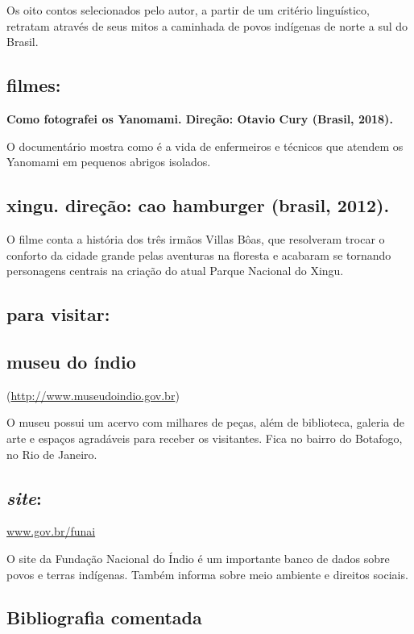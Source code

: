 \documentclass[12pt]{extarticle}
\begin{document}
Os oito contos selecionados pelo autor, a partir de um critério
linguístico, retratam através de seus mitos a caminhada de povos
indígenas de norte a sul do Brasil.

\subsection{filmes: }

\textbf{Como fotografei os Yanomami. Direção: Otavio Cury (Brasil,
2018).}

O documentário mostra como é a vida de enfermeiros e técnicos que
atendem os Yanomami em pequenos abrigos isolados.

\subsection{xingu. direção: cao hamburger (brasil, 2012).}

O filme conta a história dos três irmãos Villas Bôas, que resolveram
trocar o conforto da cidade grande pelas aventuras na floresta e
acabaram se tornando personagens centrais na criação do atual Parque
Nacional do Xingu.

\subsection{para visitar: }\subsection{museu do índio}
(\href{http://www.museudoindio.gov.br/}{{http://www.museudoindio.gov.br}})

O museu possui um acervo com milhares de peças, além de biblioteca,
galeria de arte e espaços agradáveis para receber os visitantes. Fica no
bairro do Botafogo, no Rio de Janeiro.

\subsection{\emph{site}:}

\href{http://www.gov.br/funai}{{www.gov.br/funai}}

O site da Fundação Nacional do Índio é um importante banco de dados
sobre povos e terras indígenas. Também informa sobre meio ambiente e
direitos sociais.

\subsection{Bibliografia comentada}
\end{document}

